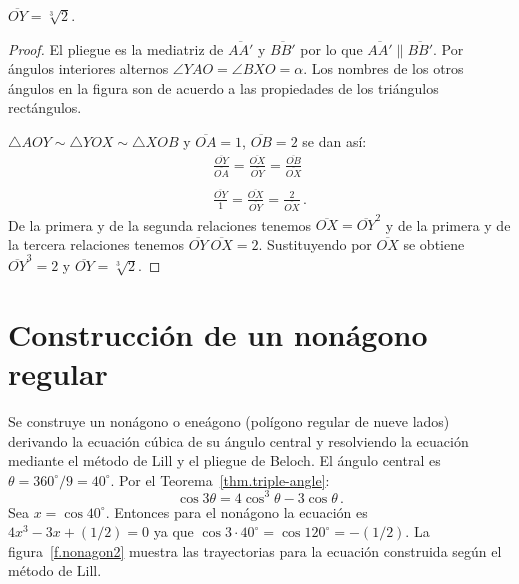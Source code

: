 \begin{theorem}
$\overline{OY}=\sqrt[3]{2}$.
\end{theorem}
\begin{proof}
El pliegue es la mediatriz de $\overline{AA'}$ y $\overline{BB'}$ por lo que $\overline{AA'}\parallel\overline{BB'}$. Por ángulos interiores alternos $\angle YAO =\angle BXO=\alpha$. Los nombres de los otros ángulos en la figura son de acuerdo a las propiedades de los triángulos rectángulos.

$\triangle AOY\sim \triangle YOX \sim \triangle XOB$ y $\overline{OA}=1$, $\overline{OB}=2$ se dan así:
\[
\begin{array}{l}
\displaystyle\frac{\overline{OY}}{\overline{OA}}=\displaystyle\frac{\overline{OX}}{\overline{OY}}=\displaystyle\frac{\overline{OB}}{\overline{OX}}\\
\\
\displaystyle\frac{\overline{OY}}{1}=\displaystyle\frac{\overline{OX}}{\overline{OY}}=\displaystyle\frac{2}{\overline{OX}}\,.
\end{array}
\]
De la primera y de la segunda relaciones tenemos $\overline{OX}=\overline{OY}^2$ y de la primera y de la tercera relaciones tenemos $\overline{OY}\:\overline{OX}=2$.
Sustituyendo por $\overline{OX}$ se obtiene $\overline{OY}^3=2$ y
$\overline{OY}=\sqrt[3]{2}$.
\end{proof}

\section{Construcción de un nonágono regular}\label{s.nonagon}

Se construye un nonágono o eneágono (polígono regular de nueve lados) derivando la ecuación cúbica de su ángulo central y resolviendo la ecuación mediante el método de Lill y el pliegue de Beloch. El ángulo central es $\theta=360^\circ/9=40^\circ$. Por el Teorema~\ref{thm.triple-angle}:
\[
\cos 3\theta=4\cos^3 \theta -3\cos\theta\,.
\]
Sea $x=\cos 40^{\circ}$. Entonces para el nonágono la ecuación es $4x^3-3x+(1/2)=0$ ya que $\cos 3\cdot 40^\circ=\cos 120^\circ=-(1/2)$. La figura~\ref{f.nonagon2} muestra las trayectorias para la ecuación construida según el método de Lill.

